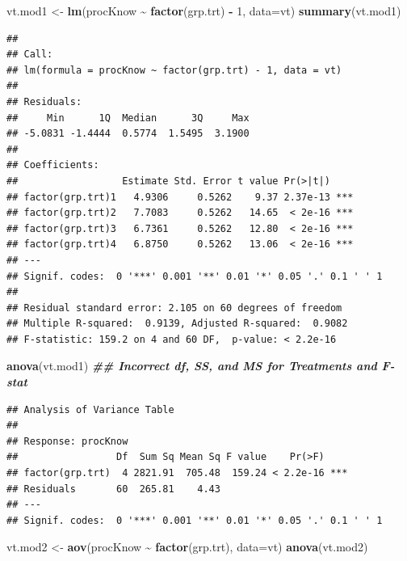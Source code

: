 \documentclass[
]{book}
\newenvironment{Shaded}{\begin{snugshade}}{\end{snugshade}}
\newcommand{\AttributeTok}[1]{\textcolor[rgb]{0.13,0.29,0.53}{#1}}
\newcommand{\DecValTok}[1]{\textcolor[rgb]{0.00,0.00,0.81}{#1}}
\newcommand{\DocumentationTok}[1]{\textcolor[rgb]{0.56,0.35,0.01}{\textbf{\textit{#1}}}}
\newcommand{\FunctionTok}[1]{\textcolor[rgb]{0.13,0.29,0.53}{\textbf{#1}}}
\newcommand{\NormalTok}[1]{#1}
\newcommand{\OtherTok}[1]{\textcolor[rgb]{0.56,0.35,0.01}{#1}}
\newcommand{\SpecialCharTok}[1]{\textcolor[rgb]{0.81,0.36,0.00}{\textbf{#1}}}
\begin{document}
\begin{Shaded}
\begin{Highlighting}[]
\NormalTok{vt.mod1 }\OtherTok{\textless{}{-}} \FunctionTok{lm}\NormalTok{(procKnow }\SpecialCharTok{\textasciitilde{}} \FunctionTok{factor}\NormalTok{(grp.trt) }\SpecialCharTok{{-}} \DecValTok{1}\NormalTok{, }\AttributeTok{data=}\NormalTok{vt)}
\FunctionTok{summary}\NormalTok{(vt.mod1)}
\end{Highlighting}
\end{Shaded}

\begin{verbatim}
## 
## Call:
## lm(formula = procKnow ~ factor(grp.trt) - 1, data = vt)
## 
## Residuals:
##     Min      1Q  Median      3Q     Max 
## -5.0831 -1.4444  0.5774  1.5495  3.1900 
## 
## Coefficients:
##                  Estimate Std. Error t value Pr(>|t|)    
## factor(grp.trt)1   4.9306     0.5262    9.37 2.37e-13 ***
## factor(grp.trt)2   7.7083     0.5262   14.65  < 2e-16 ***
## factor(grp.trt)3   6.7361     0.5262   12.80  < 2e-16 ***
## factor(grp.trt)4   6.8750     0.5262   13.06  < 2e-16 ***
## ---
## Signif. codes:  0 '***' 0.001 '**' 0.01 '*' 0.05 '.' 0.1 ' ' 1
## 
## Residual standard error: 2.105 on 60 degrees of freedom
## Multiple R-squared:  0.9139, Adjusted R-squared:  0.9082 
## F-statistic: 159.2 on 4 and 60 DF,  p-value: < 2.2e-16
\end{verbatim}

\begin{Shaded}
\begin{Highlighting}[]
\FunctionTok{anova}\NormalTok{(vt.mod1)    }\DocumentationTok{\#\# Incorrect df, SS, and MS for Treatments and F{-}stat}
\end{Highlighting}
\end{Shaded}

\begin{verbatim}
## Analysis of Variance Table
## 
## Response: procKnow
##                 Df  Sum Sq Mean Sq F value    Pr(>F)    
## factor(grp.trt)  4 2821.91  705.48  159.24 < 2.2e-16 ***
## Residuals       60  265.81    4.43                      
## ---
## Signif. codes:  0 '***' 0.001 '**' 0.01 '*' 0.05 '.' 0.1 ' ' 1
\end{verbatim}

\begin{Shaded}
\begin{Highlighting}[]
\NormalTok{vt.mod2 }\OtherTok{\textless{}{-}} \FunctionTok{aov}\NormalTok{(procKnow }\SpecialCharTok{\textasciitilde{}} \FunctionTok{factor}\NormalTok{(grp.trt), }\AttributeTok{data=}\NormalTok{vt)}
\FunctionTok{anova}\NormalTok{(vt.mod2)}
\end{Highlighting}
\end{Shaded}
\end{document}
